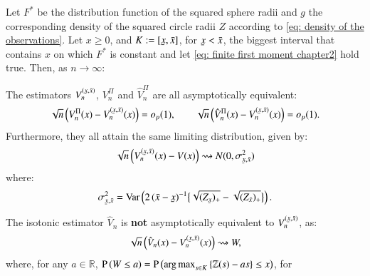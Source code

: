 \begin{theorem}[Asymptotics]\label{thm: distrib flat F at x total}
     Let $F^*$ be the distribution function of the squared sphere radii and $g$ the corresponding density of the squared circle radii $Z$ according to \eqref{eq: density of the observations}. Let $x \geq 0$, and $K:=[\ubar{x},\bar{x}]$, for $\ubar{x}<\bar{x}$, the biggest interval that contains $x$ on which $F^*$ is constant and let \eqref{eq: finite first moment chapter2} hold true. Then, as $n \rightarrow \infty$:
    \begin{thmlist}
        \item The estimators $V^{(\ubar{x},\bar{x})}_n$, $V^{\Pi}_n$ and $\hat{V}^{\Pi}_n$ are all asymptotically equivalent: \label{thm: distrib flat F at x total 2}
                \begin{align*}
                    \sqrt{n} \left(  V^{\Pi}_n(x) -V^{(\ubar{x},\bar{x})}_n (x) \right) = o_p(1), \quad \quad \sqrt{n} \left(  \hat{V}^{\Pi}_n(x) -V^{(\ubar{x},\bar{x})}_n (x) \right) = o_p(1).
                \end{align*}
                Furthermore, they all attain the same limiting distribution, given by:
                \begin{align*}
                    \sqrt{n} \left(  V^{(\ubar{x},\bar{x})}_n (x) - V (x) \right) \rightsquigarrow N(0,\sigma^2_{\ubar{x},\bar{x}})
                \end{align*}
                where: 
                \begin{align}\label{eq: sigma}
                    \sigma^2_{\ubar{x},\bar{x}} = \mathrm{Var}  \left( 2 \, (\bar{x}-\ubar{x})^{-1} \big\{ \sqrt{\smash[b]{(Z_{\ubar{x}})_{+}}} - \sqrt{\smash[b]{(Z_{\bar{x}})_{+}}} \big\} \right).
                \end{align}
                \vspace{-0.3cm}
        \item The isotonic estimator $\hat{V}_n$ is \textbf{not} asymptotically equivalent to $V^{(\ubar{x},\bar{x})}_n$, as: \label{thm: distrib flat F at x total 1}
            \begin{align}\label{eq: limiting W}
                \sqrt{n} \left( \hat{V}_n(x) -V^{(\ubar{x},\bar{x})}_n (x) \right) \rightsquigarrow W,
            \end{align}
            where, for any $a \in \mathbb{R}$, $\mathrm{P} \left( W \leq a \right) = \mathrm{P} \left( \operatorname*{arg\,max}_{s \in K} \left\{ \mathbb{Z}(s) - a s\right\} \leq x \right) $, for
            \begin{align*}

\end{align*}
\end{thmlist}
\end{theorem}
